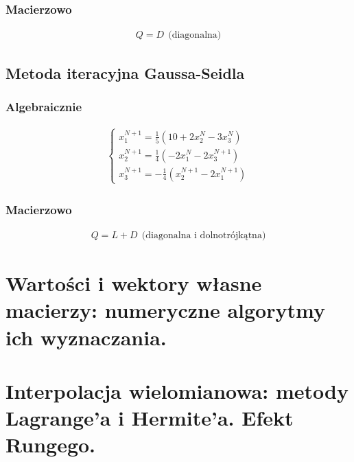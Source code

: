 \documentclass[12pt]{article}
\begin{document}
    \subsubsection{Macierzowo}
    \begin{align*}
        Q = D ~~ \text{(diagonalna)}
    \end{align*}

    \subsection{Metoda iteracyjna Gaussa-Seidla}
    \subsubsection{Algebraicznie}
    \begin{align*}
        \left\{\begin{matrix}
                   x^{N+1}_1 = \frac{1}{5}(10 + 2x^N_2 - 3x^N_3)\\
                   x^{N+1}_2 = \frac{1}{4}(-2x^N_1 - 2x^{N+1}_3)\\
                   x^{N+1}_3 = -\frac{1}{4}(x^{N+1}_2 - 2x^{N+1}_1)
        \end{matrix}\right.
    \end{align*}

    \subsubsection{Macierzowo}
    \begin{align*}
        Q = L + D ~~ \text{(diagonalna i dolnotrójkątna)}
    \end{align*}


    \newpage

    \section{Wartości i wektory własne macierzy: numeryczne algorytmy ich wyznaczania.}

    \newpage

    \section{Interpolacja wielomianowa: metody Lagrange'a i Hermite'a. Efekt Rungego.}
\end{document}
